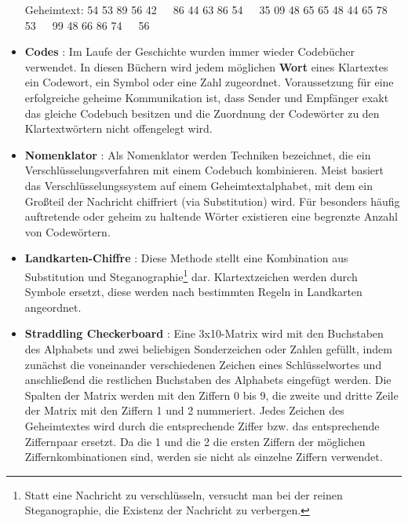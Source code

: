 \begin{refsegment}
\begin{itemize}
\begin{table}[ht]
   \end{table}%
	
   Geheimtext:
   54 53 89 56 42~~~86 44 63 86 54~~~35 09 48 65 65
   48 44 65 78 53~~~99 48 66 86 74~~~56\\


\item {\bf Codes} \cite{Singh2001}: Im Laufe der Geschichte wurden immer
   wieder Codebücher verwendet. In diesen Büchern wird jedem möglichen
   {\bf Wort} eines Klartextes ein Codewort, ein Symbol oder eine Zahl
   zugeordnet.
   Voraussetzung für eine erfolgreiche geheime Kommunikation ist, dass
   Sender und Empfänger exakt das gleiche Codebuch besitzen und die
   Zuordnung der Codewörter zu den Klartextwörtern nicht offengelegt wird.

\item {\bf Nomenklator} \cite{Singh2001}:
   Als Nomenklator werden Techniken bezeichnet, die ein Verschlüsselungsverfahren
   mit einem Codebuch kombinieren. Meist basiert das Verschlüsselungssystem auf
   einem Geheimtextalphabet, mit dem ein Großteil der Nachricht chiffriert
   (via Substitution) wird. Für besonders häufig auftretende oder
   geheim zu haltende Wörter existieren eine begrenzte Anzahl von Codewörtern.

\item {\bf Landkarten-Chiffre} \cite{ThinkQuest1999}:
   Diese Methode stellt eine Kombination aus
   Substitution und Steganographie\footnote{Statt eine Nachricht zu
   verschlüsseln, versucht man bei der reinen
   Steganographie, die Existenz
   der Nachricht zu verbergen.} dar.
   Klartextzeichen werden durch Symbole ersetzt, diese werden nach bestimmten
   Regeln in Landkarten angeordnet.


\item {\bf Straddling Checkerboard}
   \cite{Goebel2014}:
   Eine 3x10-Matrix wird
   mit den Buchstaben des Alphabets und zwei beliebigen Sonderzeichen oder
   Zahlen gefüllt, indem zunächst die voneinander verschiedenen Zeichen
   eines Schlüsselwortes und anschließend die restlichen Buchstaben des
   Alphabets eingefügt werden. Die Spalten der Matrix werden mit den Ziffern
   0 bis 9, die zweite und dritte Zeile der Matrix mit den Ziffern 1 und 2
   nummeriert. Jedes Zeichen des Geheimtextes wird durch die entsprechende
   Ziffer bzw. das entsprechende Ziffernpaar ersetzt. Da die 1 und die 2
   die ersten Ziffern der möglichen Ziffernkombinationen sind, werden
   sie nicht als einzelne Ziffern verwendet.


\end{itemize}
\end{refsegment}
